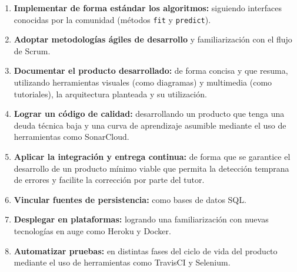\begin{enumerate}
	\item \textbf{Implementar de forma estándar los algoritmos:} siguiendo interfaces conocidas por la comunidad (métodos \texttt{fit} y \texttt{predict}).
	\item \textbf{Adoptar metodologías ágiles de desarrollo} y familiarización con el flujo de Scrum.
	\item \textbf{Documentar el producto desarrollado:} de forma concisa y que resuma, utilizando herramientas visuales (como diagramas) y multimedia (como tutoriales), la arquitectura planteada y su utilización.
	\item \textbf{Lograr un código de calidad:} desarrollando un producto que tenga una deuda técnica baja y una curva de aprendizaje asumible mediante el uso de herramientas como SonarCloud.
	\item \textbf{Aplicar la integración y entrega continua:} de forma que se garantice el desarrollo de un producto mínimo viable que permita la detección temprana de errores y facilite la corrección por parte del tutor.
	\item \textbf{Vincular fuentes de persistencia:} como bases de datos SQL.
	\item \textbf{Desplegar en plataformas:} logrando una familiarización con nuevas tecnologías en auge como Heroku y Docker.
	\item \textbf{Automatizar pruebas:} en distintas fases del ciclo de vida del producto mediante el uso de herramientas como TravisCI y Selenium.
	
\end{enumerate}